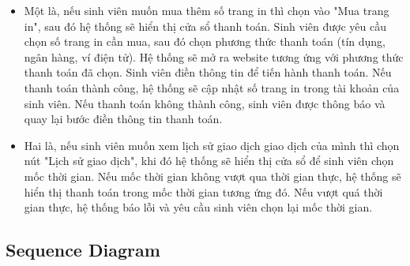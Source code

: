 \documentclass[a4paper]{article}
\begin{document}
\begin{itemize}
    \item Một là, nếu sinh viên muốn mua thêm số trang in thì chọn vào "Mua trang in", sau đó hệ thống sẽ hiển thị cửa sổ thanh toán. Sinh viên được yêu cầu chọn số trang in cần mua, sau đó chọn phương thức thanh toán (tín dụng, ngân hàng, ví điện tử). Hệ thống sẽ mở ra website tương ứng với phương thức thanh toán đã chọn. Sinh viên điền thông tin để tiến hành thanh toán. Nếu thanh toán thành công, hệ thống sẽ cập nhật số trang in trong tài khoản của sinh viên. Nếu thanh toán không thành công, sinh viên được thông báo và quay lại bước điền thông tin thanh toán.
    \item Hai là, nếu sinh viên muốn xem lịch sử giao dịch giao dịch của mình thì chọn nút "Lịch sử giao dịch", khi đó hệ thống sẽ hiển thị cửa sổ để sinh viên chọn mốc thời gian. Nếu mốc thời gian không vượt qua thời gian thực, hệ thống sẽ hiển thị thanh toán trong mốc thời gian tương ứng đó. Nếu vượt quá thời gian thực, hệ thống báo lỗi và yêu cầu sinh viên chọn lại mốc thời gian.
\end{itemize}


\newpage
\subsection{Sequence Diagram}
\end{document}
